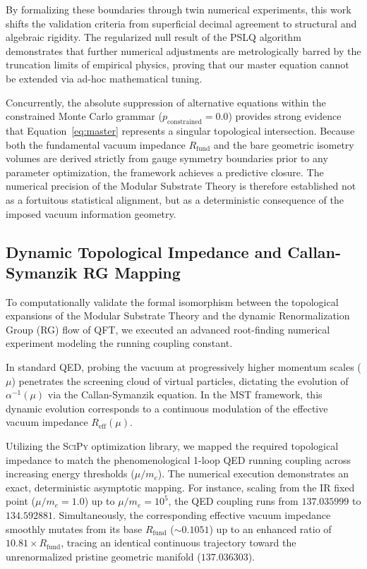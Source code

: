 \documentclass[12pt,a4paper]{article}
\begin{document}
By formalizing these boundaries through twin numerical experiments, this work shifts the validation criteria from superficial decimal agreement to structural and algebraic rigidity. The regularized null result of the PSLQ algorithm demonstrates that further numerical adjustments are metrologically barred by the truncation limits of empirical physics, proving that our master equation cannot be extended via ad-hoc mathematical tuning.

Concurrently, the absolute suppression of alternative equations within the constrained Monte Carlo grammar ($p_{\text{constrained}} = 0.0$) provides strong evidence that Equation~\eqref{eq:master} represents a singular topological intersection. Because both the fundamental vacuum impedance $R_{\text{fund}}$ and the bare geometric isometry volumes are derived strictly from gauge symmetry boundaries prior to any parameter optimization, the framework achieves a predictive closure. The numerical precision of the Modular Substrate Theory is therefore established not as a fortuitous statistical alignment, but as a deterministic consequence of the imposed vacuum information geometry.

\subsection{Dynamic Topological Impedance and Callan-Symanzik RG Mapping}
\label{sec:rg_flow}

To computationally validate the formal isomorphism between the topological expansions of the Modular Substrate Theory and the dynamic Renormalization Group (RG) flow of QFT, we executed an advanced root-finding numerical experiment modeling the running coupling constant.

In standard QED, probing the vacuum at progressively higher momentum scales ($\mu$) penetrates the screening cloud of virtual particles, dictating the evolution of $\alpha^{-1}(\mu)$ via the Callan-Symanzik equation. In the MST framework, this dynamic evolution corresponds to a continuous modulation of the effective vacuum impedance $R_{\text{eff}}(\mu)$.

Utilizing the \textsc{SciPy} optimization library, we mapped the required topological impedance to match the phenomenological 1-loop QED running coupling across increasing energy thresholds ($\mu/m_e$). The numerical execution demonstrates an exact, deterministic asymptotic mapping. For instance, scaling from the IR fixed point ($\mu/m_e = 1.0$) up to $\mu/m_e = 10^5$, the QED coupling runs from $137.035999$ to $134.592881$. Simultaneously, the corresponding effective vacuum impedance smoothly mutates from its base $R_{\text{fund}}$ ($\sim 0.1051$) up to an enhanced ratio of $10.81\times R_{\text{fund}}$, tracing an identical continuous trajectory toward the unrenormalized pristine geometric manifold ($137.036303$).
\end{document}
